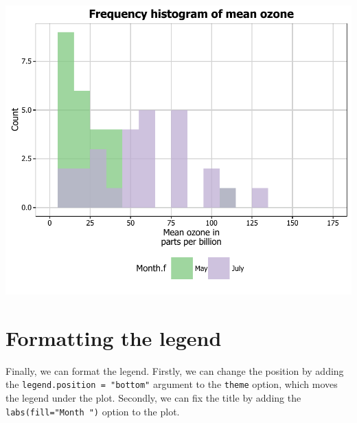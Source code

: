 \begin{center}\includegraphics[width=0.6\linewidth]{7_Histograms_pdf/histogram_20-1} \end{center}

\section{Formatting the legend}\label{formatting-the-legend}

Finally, we can format the legend. Firstly, we can change the position
by adding the \texttt{legend.position\ =\ "bottom"} argument to the
\texttt{theme} option, which moves the legend under the plot. Secondly,
we can fix the title by adding the \texttt{labs(fill="Month\ ")} option
to the plot.

